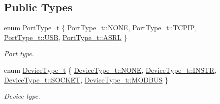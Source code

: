 \subsection*{Public Types}
\begin{DoxyCompactItemize}
\item 
enum \hyperlink{classmdt_device_address_a87fedc5c0ede4736bcc939f453bf0ed0}{Port\-Type\-\_\-t} \{ \hyperlink{classmdt_device_address_a87fedc5c0ede4736bcc939f453bf0ed0ab50339a10e1de285ac99d4c3990b8693}{Port\-Type\-\_\-t\-::\-N\-O\-N\-E}, 
\hyperlink{classmdt_device_address_a87fedc5c0ede4736bcc939f453bf0ed0a487b5042489631a7727321162579c3a5}{Port\-Type\-\_\-t\-::\-T\-C\-P\-I\-P}, 
\hyperlink{classmdt_device_address_a87fedc5c0ede4736bcc939f453bf0ed0a7aca5ec618f7317328dcd7014cf9bdcf}{Port\-Type\-\_\-t\-::\-U\-S\-B}, 
\hyperlink{classmdt_device_address_a87fedc5c0ede4736bcc939f453bf0ed0a5100e6dba69c30d5af23e7b0624f12ca}{Port\-Type\-\_\-t\-::\-A\-S\-R\-L}
 \}
\begin{DoxyCompactList}\small\item\em Port type. \end{DoxyCompactList}\item 
enum \hyperlink{classmdt_device_address_a8e776267826886cd846fb2d75b9b7b2b}{Device\-Type\-\_\-t} \{ \hyperlink{classmdt_device_address_a8e776267826886cd846fb2d75b9b7b2bab50339a10e1de285ac99d4c3990b8693}{Device\-Type\-\_\-t\-::\-N\-O\-N\-E}, 
\hyperlink{classmdt_device_address_a8e776267826886cd846fb2d75b9b7b2bac48b30e1372f2477bb18dc29450acdf4}{Device\-Type\-\_\-t\-::\-I\-N\-S\-T\-R}, 
\hyperlink{classmdt_device_address_a8e776267826886cd846fb2d75b9b7b2ba75fbea08c09e684e6b3f3961761354fa}{Device\-Type\-\_\-t\-::\-S\-O\-C\-K\-E\-T}, 
\hyperlink{classmdt_device_address_a8e776267826886cd846fb2d75b9b7b2ba7b25be9aa462c983626e10cc14056101}{Device\-Type\-\_\-t\-::\-M\-O\-D\-B\-U\-S}
 \}
\begin{DoxyCompactList}\small\item\em Device type. \end{DoxyCompactList}\end{DoxyCompactItemize}
